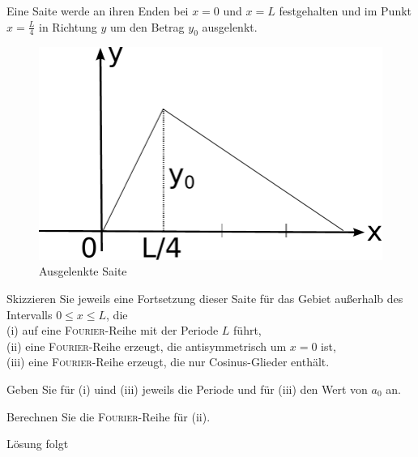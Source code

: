 \documentclass{atistandalonetask}
\begin{document}
  \begin{atiTask}[
    title = Auslenkung einer Seite
  ]
	Eine Saite werde an ihren Enden bei $x=0$ und $x=L$ festgehalten und im Punkt $x=\frac{L}{4}$ in Richtung $y$ um den Betrag $y_0$ ausgelenkt.
	\begin{figure}[H]
	\centering
	\includegraphics[width=0.7\linewidth]{picture-fourier_iv}
	\caption{Ausgelenkte Saite}
	\end{figure}

	\begin{atiSubtasks}
		\item
		Skizzieren Sie jeweils eine Fortsetzung dieser Saite für das Gebiet außerhalb des Intervalls $0\leq x\leq L$, die  \\
		(i) auf eine \textsc{Fourier}-Reihe mit der Periode $L$ führt,\\
		(ii) eine \textsc{Fourier}-Reihe erzeugt, die antisymmetrisch um $x=0$ ist,\\
		(iii) eine \textsc{Fourier}-Reihe erzeugt, die nur Cosinus-Glieder enthält.
		
		\item Geben Sie für (i) uind (iii) jeweils die Periode und für (iii) den Wert von $a_0$ an.
		\item Berechnen Sie die \textsc{Fourier}-Reihe für (ii). 		
	\end{atiSubtasks} 
  \end{atiTask}
  \begin{atiSolution}
   Lösung folgt
  \end{atiSolution}
\end{document}
